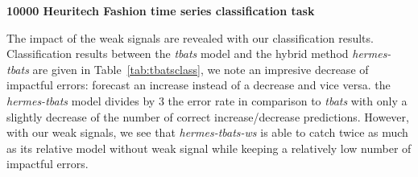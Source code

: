 \documentclass{article} %
\begin{document}
\textbf{10000 Heuritech Fashion time series classification task}

The impact of the weak signals are revealed with our classification results. Classification results between the \textit{tbats} model and the hybrid method \textit{hermes-tbats} are given in Table~\ref{tab:tbatsclass}, we note an impresive decrease of impactful errors: forecast an increase instead of a decrease and vice versa. the \textit{hermes-tbats} model divides by 3 the error rate in comparison to \textit{tbats} with only a slightly decrease of the number of correct increase/decrease predictions. However, with our weak signals, we see that \textit{hermes-tbats-ws} is able to catch twice as much as its relative model without weak signal while keeping a relatively low number of impactful errors.


\end{document}
